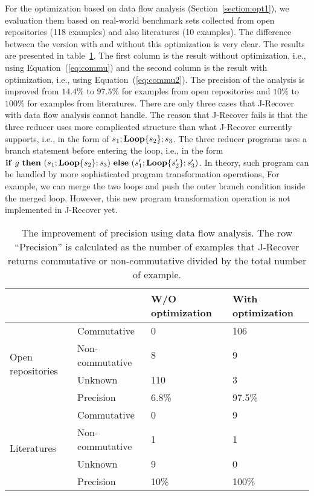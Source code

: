 \documentclass{llncs}
\newcommand{\ite}[3]{
	 \ifmmode 
	 \mathbf{if}\ #1 \ \mathbf{then}\ #2\  \mathbf{else}\ #3 
	 \else
	 \textbf{if}\ #1 \ \textbf{then}\ #2\  \textbf{else}\ #3
	 \fi}
\newcommand{\rloop}{
	\ifmmode 
	\mathbf{Loop}
	\else
	\textbf{Loop}
	\fi}
\begin{document}
For the optimization based on data flow analysis (Section~\ref{section:opt1}), we evaluation them based on real-world benchmark sets collected from open repositories (118 examples) and also literatures (10 examples). The difference between the version with and without this optimization is very clear. The results are presented in table~\ref{tab:opt1}. The first column is the result without optimization, i.e., using Equation~(\ref{eq:commu}) and the second column is the result with optimization, i.e., using Equation~(\ref{eq:commu2}). The precision of the analysis is improved from $14.4\%$ to $97.5\%$ for examples from open repositories and
$10\%$ to $100\%$ for examples from literatures. There are only three cases that J-Recover with data flow analysis cannot handle. The reason that J-Recover fails is that the three reducer uses more complicated structure than what J-Recover currently supports, i.e., in the form of $s_1;\rloop\{s_2\};s_3$. The three reducer programs uses a branch statement before entering the loop, i.e., in the form $\ite{g}{(s_1;\rloop\{s_2\};s_3)}{(s'_1;\rloop\{s'_2\};s'_3)}$. In theory, such program can be handled by more sophisticated program transformation operations, For example, we can merge the two loops and push the outer branch condition inside the merged loop. 
However, this new program transformation operation is not implemented in J-Recover yet.

\begin{table}[htb]
	\centering
	\begin{tabular}{|l|l|l|l|}
		\hline
		& &W/O optimization	& With optimization\\
		\hline
		\hline
		\multirow{4}{*}{Open repositories}&Commutative& 0&106\\ 
		\cline{2-4}
		&Non-commutative&8&9\\
		\cline{2-4}
		&Unknown&110&3\\
		\cline{2-4}
		&Precision& 6.8\% & 97.5\%\\
		\hline
		\hline
		\multirow{4}{*}{Literatures}&Commutative& 0&9\\
		\cline{2-4}
		&Non-commutative&1&1\\
		\cline{2-4}
		&Unknown&9&0\\
		\cline{2-4}
		&Precision& 10\% & 100\%\\
		\hline
	\end{tabular}
	\caption{The improvement of precision using data flow analysis. The row ``Precision'' is calculated as the number of examples that J-Recover returns commutative or non-commutative divided by the total number of example.}
	\label{tab:opt1}
\end{table}
\end{document}
